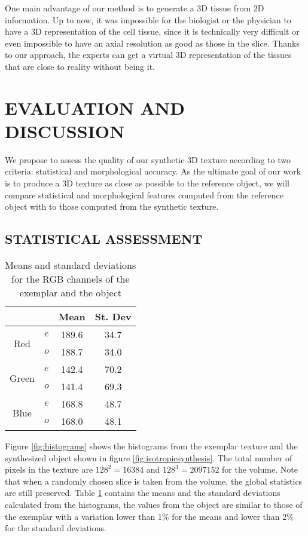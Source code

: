 One main advantage of our method is to generate a 3D tissue from 2D information. 
Up to now, it was impossible for the biologist or the physician to have a 3D representation 
of the cell tissue, since it is technically very difficult or even impossible to have 
an axial resolution as good as those in the slice. 
Thanks to our approach, the experts can get a virtual 3D representation of the tissues 
that are close to reality without being it.

\section{\uppercase{Evaluation and Discussion}}
\label{sec:Evaluation}

We propose to assess the quality of our synthetic 3D texture according to two criteria: 
statistical and morphological accuracy. 
As the ultimate goal of our work is to produce a 3D texture as close as possible to the reference object, 
we will compare statistical and morphological features computed from the reference object with to those 
computed from the synthetic texture. 

\subsection{\uppercase{Statistical assessment }}
\label{sec:Statistics}

\begin{table}[h]
\centering
\begin{tabular}{|c|c|c|c|}
  \hline
  & & Mean & St. Dev  \\
  \hline
  \multirow{2}{*}{Red} & $e$ & 189.6  & 34.7  \\
		       & $o$ & 188.7 & 34.0 \\
  \hline
  \multirow{2}{*}{Green} & $e$ & 142.4 & 70.2 \\
		         & $o$ & 141.4 & 69.3 \\
  \hline
  \multirow{2}{*}{Blue} & $e$ & 168.8  & 48.7 \\
		        & $o$ & 168.0  & 48.1 \\
  \hline
\end{tabular}
\caption{Means and standard deviations for the RGB channels of the exemplar and the object}
\label{tab:statshisto} 
\end{table}

Figure \ref{fig:histograms} shows the histograms from the exemplar texture and the synthesized object shown 
in figure \ref{fig:isotropicsynthesis}. The total number of pixels in the texture are $128^2 = 16384$ and
$128^3 = 2097152$ for the volume. Note that when a randomly chosen slice is taken from the volume, 
the global statistics are still preserved. 
Table \ref{tab:statshisto} contains the means and the standard deviations calculated from the histograms, the values
from the object are similar to those of the exemplar with a variation lower than 1$\%$ for the means and lower than 2$\%$ for the standard deviations. 

